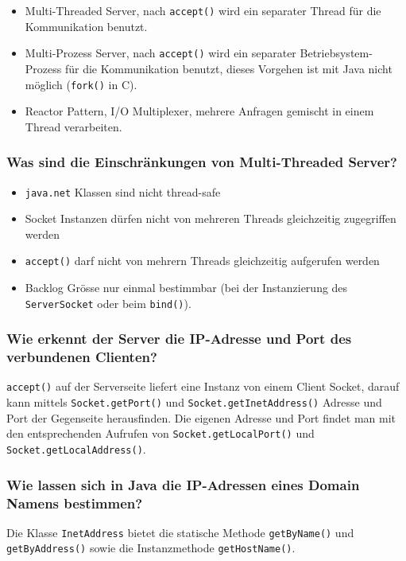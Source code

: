 \documentclass[10pt,a4paper]{scrartcl}
\begin{document}
\begin{itemize}
	\item Multi-Threaded Server, nach \texttt{accept()} wird ein separater Thread für die
		Kommunikation benutzt.
	\item Multi-Prozess Server, nach \texttt{accept()} wird ein separater Betriebsystem-Prozess für
		die Kommunikation benutzt, dieses Vorgehen ist mit Java nicht möglich (\texttt{fork()} in C).
	\item Reactor Pattern, I/O Multiplexer, mehrere Anfragen gemischt in einem Thread verarbeiten.
\end{itemize}

\subsubsection{Was sind die Einschränkungen von Multi-Threaded Server?}

\begin{itemize}
	\item \texttt{java.net} Klassen sind nicht thread-safe
	\item Socket Instanzen dürfen nicht von mehreren Threads gleichzeitig zugegriffen werden
	\item \texttt{accept()} darf nicht von mehrern Threads gleichzeitig aufgerufen werden
	\item Backlog Grösse nur einmal bestimmbar (bei der Instanzierung des \texttt{ServerSocket} oder
		beim \texttt{bind()}).
\end{itemize}

\subsubsection{Wie erkennt der Server die IP-Adresse und Port des verbundenen Clienten?}

\texttt{accept()} auf der Serverseite liefert eine Instanz von einem Client Socket, darauf kann
mittels \texttt{Socket.getPort()} und \texttt{Socket.getInetAddress()} Adresse und Port der
Gegenseite herausfinden. Die eigenen Adresse und Port findet man mit den entsprechenden Aufrufen
von \texttt{Socket.getLocalPort()} und \texttt{Socket.getLocalAddress()}.
  
\subsubsection{Wie lassen sich in Java die IP-Adressen eines Domain Namens bestimmen?}

Die Klasse \texttt{InetAddress} bietet die statische Methode \texttt{getByName()} und
\texttt{getByAddress()} sowie die Instanzmethode \texttt{getHostName()}.
\end{document}
